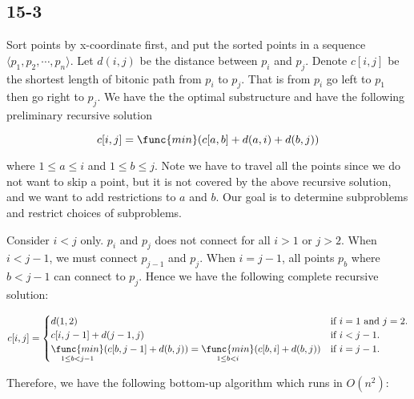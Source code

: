 \subsection*{15-3}

\noindent
Sort points by x-coordinate first,
and put the sorted points in a sequence
$\langle p_1, p_2, \cdots, p_n \rangle$.
Let $d(i,j)$ be the distance between $p_i$ and $p_j$.
Denote $c[i,j]$ be the shortest length of bitonic path from $p_i$ to $p_j$.
That is from $p_i$ go left to $p_1$ then go right to $p_j$.
We have the the optimal substructure 
and have the following preliminary recursive solution

\begin{equation*}
    c[i,j] = \func{min}(c[a,b] + d(a,i) + d(b,j))
\end{equation*}

\noindent
where $1 \leq a \leq i$ and $1 \leq b \leq j$.
Note we have to travel all the points 
since we do not want to skip a point,
but it is not covered by the above recursive solution,
and we want to add restrictions to $a$ and $b$.
Our goal is to determine subproblems and restrict choices of subproblems.

\noindent
Consider $i < j$ only.
$p_i$ and $p_j$ does not connect for all $i > 1$ or $j > 2$.
When $i < j - 1$, we must connect $p_{j-1}$ and $p_j$.
When $i = j - 1$, all points $p_b$ where $b < j - 1$ can connect to $p_j$.
Hence we have the following complete recursive solution:

$c[i,j]=
\begin{cases}
    d(1,2) & \text{if $i = 1$ and $j = 2$.} \\
    c[i,j-1] + d(j-1,j) & \text{if $i < j-1$.} \\
    \mathop{\func{min}}\limits_{1 \leq b < j-1}(c[b,j-1] + d(b,j)) 
        =\mathop{\func{min}}\limits_{1 \leq b < i}(c[b,i] + d(b,j))
        & \text{if $i = j - 1$.}
\end{cases}$

\noindent
Therefore, we have the following bottom-up algorithm which runs in $O(n^2)$:


